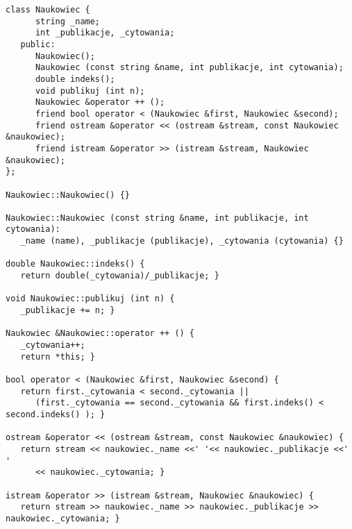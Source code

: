 \documentclass[12pt]{article}
\begin{document}
\begin{verbatim}
class Naukowiec {
      string _name;
      int _publikacje, _cytowania;
   public:
      Naukowiec();
      Naukowiec (const string &name, int publikacje, int cytowania);
      double indeks();
      void publikuj (int n);
      Naukowiec &operator ++ ();
      friend bool operator < (Naukowiec &first, Naukowiec &second);
      friend ostream &operator << (ostream &stream, const Naukowiec &naukowiec);
      friend istream &operator >> (istream &stream, Naukowiec &naukowiec);
};

Naukowiec::Naukowiec() {}

Naukowiec::Naukowiec (const string &name, int publikacje, int cytowania):
   _name (name), _publikacje (publikacje), _cytowania (cytowania) {}

double Naukowiec::indeks() {
   return double(_cytowania)/_publikacje; }

void Naukowiec::publikuj (int n) {
   _publikacje += n; }

Naukowiec &Naukowiec::operator ++ () {
   _cytowania++;
   return *this; }
	
bool operator < (Naukowiec &first, Naukowiec &second) {
   return first._cytowania < second._cytowania ||
      (first._cytowania == second._cytowania && first.indeks() < second.indeks() ); }
	
ostream &operator << (ostream &stream, const Naukowiec &naukowiec) {
   return stream << naukowiec._name <<' '<< naukowiec._publikacje <<' '
      << naukowiec._cytowania; }

istream &operator >> (istream &stream, Naukowiec &naukowiec) {
   return stream >> naukowiec._name >> naukowiec._publikacje >> naukowiec._cytowania; }
\end{verbatim}
\end{document}
